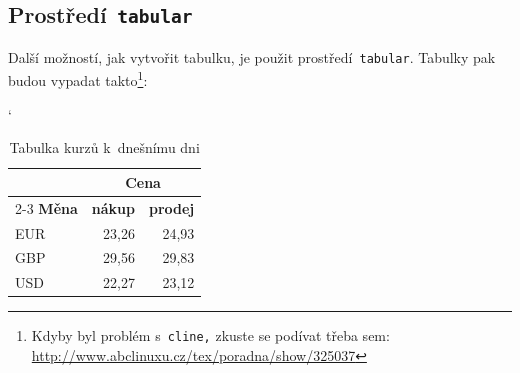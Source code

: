 \documentclass[11pt, a4paper]{article}
\begin{document}
\subsection{Prostředí\texttt{ tabular}}
Další možností, jak vytvořit tabulku, je použit prostředí\texttt{ tabular}. Tabulky pak budou vypadat 
takto\footnote{Kdyby byl problém s\texttt{ cline,} zkuste se podívat třeba sem: \href{http://www.abclinuxu.cz/tex/poradna/show/325037}{http://www.abclinuxu.cz/tex/poradna/show/325037}}:
\\
\begin{table}[ht]
    \catcode`
    \begin{center}
        \begin{tabular}{|l|r|r|} \hline
            & \multicolumn{2}{c|}{\textbf{Cena}} \\
            \cline{2-3}
            \textbf{Měna} & \textbf{nákup} & \textbf{prodej} \\
            \hline
            EUR & 23{,}26 & 24{,}93 \\
            GBP & 29{,}56 & 29{,}83 \\
            USD & 22{,}27 & 23{,}12 \\
            \hline
        \end{tabular}
        \caption{Tabulka kurzů k~dnešnímu dni\label{tab:kursy}}
    \end{center}
\end{table}
\end{document}
